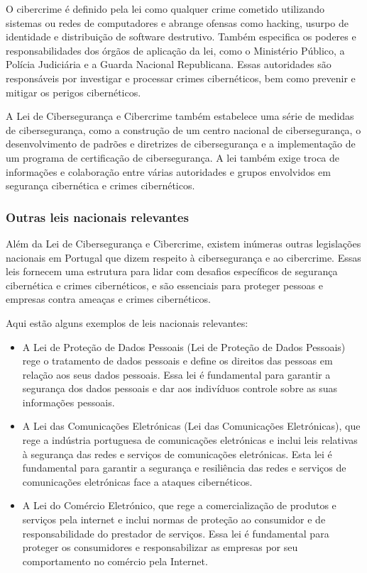 O cibercrime é definido pela lei como qualquer crime cometido utilizando sistemas ou redes de computadores e abrange ofensas como hacking, usurpo de identidade e distribuição de software destrutivo. Também especifica os poderes e responsabilidades dos órgãos de aplicação da lei, como o Ministério Público, a Polícia Judiciária e a Guarda Nacional Republicana. Essas autoridades são responsáveis por investigar e processar crimes cibernéticos, bem como prevenir e mitigar os perigos cibernéticos.

A Lei de Cibersegurança e Cibercrime também estabelece uma série de medidas de cibersegurança, como a construção de um centro nacional de cibersegurança, o desenvolvimento de padrões e diretrizes de cibersegurança e a implementação de um programa de certificação de cibersegurança. A lei também exige troca de informações e colaboração entre várias autoridades e grupos envolvidos em segurança cibernética e crimes cibernéticos.

\subsubsection{Outras leis nacionais relevantes}

Além da Lei de Cibersegurança e Cibercrime, existem inúmeras outras legislações nacionais em Portugal que dizem respeito à cibersegurança e ao cibercrime. Essas leis fornecem uma estrutura para lidar com desafios específicos de segurança cibernética e crimes cibernéticos, e são essenciais para proteger pessoas e empresas contra ameaças e crimes cibernéticos.

Aqui estão alguns exemplos de leis nacionais relevantes:

\begin{itemize}
  \item A Lei de Proteção de Dados Pessoais (Lei de Proteção de Dados Pessoais) rege o tratamento de dados pessoais e define os direitos das pessoas em relação aos seus dados pessoais. Essa lei é fundamental para garantir a segurança dos dados pessoais e dar aos indivíduos controle sobre as suas informações pessoais.
  \item A Lei das Comunicações Eletrónicas (Lei das Comunicações Eletrónicas), que rege a indústria portuguesa de comunicações eletrónicas e inclui leis relativas à segurança das redes e serviços de comunicações eletrónicas. Esta lei é fundamental para garantir a segurança e resiliência das redes e serviços de comunicações eletrónicas face a ataques cibernéticos.
  \item A Lei do Comércio Eletrónico, que rege a comercialização de produtos e serviços pela internet e inclui normas de proteção ao consumidor e de responsabilidade do prestador de serviços. Essa lei é fundamental para proteger os consumidores e responsabilizar as empresas por seu comportamento no comércio pela Internet.
\end{itemize}

